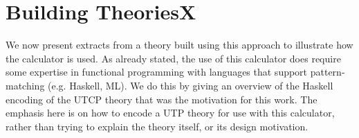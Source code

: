 \section{Building TheoriesX}\label{sec:TheorisingX}


We now present extracts from a theory built using this
approach to illustrate how the calculator is used.
As already stated,
the use of this calculator does require some expertise
in functional programming with languages that support
pattern-matching (e.g. Haskell, ML).
We do this by giving an overview of the Haskell encoding
of the UTCP theory
that was the motivation for this work.
The emphasis here is on how to encode a UTP theory for use with this
calculator,
rather than trying to explain the theory itself, or its design motivation.


